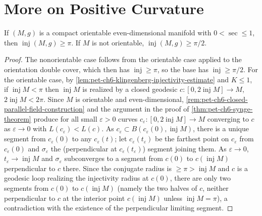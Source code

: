 \section{More on Positive Curvature}

\begin{theorem}
  \label{thm:pet-ch6-klingenberg-even-dim-injectivity}
  If $(M,g)$ is a compact orientable even-dimensional manifold with
  $0<\sec\le1$, then $\operatorname{inj}(M,g)\ge\pi$. If $M$ is not orientable,
  $\operatorname{inj}(M,g)\ge\pi/2$.
\end{theorem}
\begin{proof}
  The nonorientable case follows from the orientable case applied to the
  orientation double cover, which then has $\operatorname{inj}\ge\pi$, so the base has
  $\operatorname{inj}\ge\pi/2$. For the orientable case, by
  \cref{lem:pet-ch6-klingenberg-injectivity-estimate} and $K\le1$, if
  $\operatorname{inj}M<\pi$ then $\operatorname{inj}M$ is realized by a closed geodesic
  $c:[0,2\operatorname{inj}M]\to M$, $2\operatorname{inj}M<2\pi$. Since $M$ is orientable and
  even-dimensional, \cref{rem:pet-ch6-closed-parallel-field-construction}
  and the argument in the proof of \cref{thm:pet-ch6-synge-theorem} produce
  for all small $\varepsilon>0$ curves $c_\varepsilon:[0,2\operatorname{inj}M]\to M$
  converging to $c$ as $\varepsilon\to0$ with $L(c_\varepsilon)<L(c)$. As
  $c_\varepsilon\subset B(c_\varepsilon(0),\operatorname{inj}M)$, there is a unique
  segment from $c_\varepsilon(0)$ to any $c_\varepsilon(t)$; let
  $c_\varepsilon(t_\varepsilon)$ be the farthest point on $c_\varepsilon$ from
  $c_\varepsilon(0)$ and $\sigma_\varepsilon$ the (perpendicular at
  $c_\varepsilon(t_\varepsilon)$) segment joining them. As $\varepsilon\to0$,
  $t_\varepsilon\to\operatorname{inj}M$ and $\sigma_\varepsilon$ subconverges to a
  segment from $c(0)$ to $c(\operatorname{inj}M)$ perpendicular to $c$ there. Since the
  conjugate radius is $\ge\pi>\operatorname{inj}M$ and $c$ is a geodesic loop realizing
  the injectivity radius at $c(0)$, there are only two segments from $c(0)$
  to $c(\operatorname{inj}M)$ (namely the two halves of $c$, neither perpendicular to
  $c$ at the interior point $c(\operatorname{inj}M)$ unless $\operatorname{inj}M=\pi$), a
  contradiction with the existence of the perpendicular limiting segment.
\end{proof}

